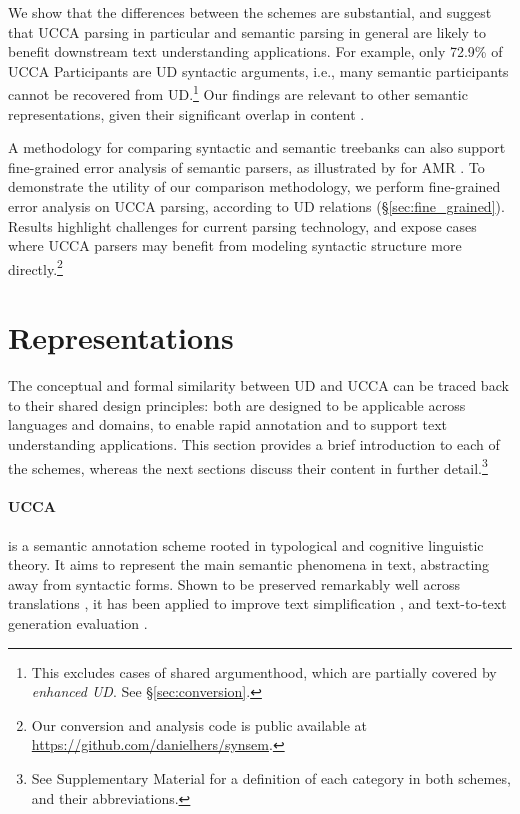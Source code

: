 \documentclass[11pt,a4paper,table]{article}
\begin{document}
  We show that the differences between the schemes are substantial, and suggest that
  UCCA parsing in particular and semantic parsing in general are likely to benefit
  downstream text understanding applications.
  For example, only 72.9\% of UCCA Participants are UD syntactic arguments,
  i.e., many semantic participants cannot be recovered from UD.\footnote{This excludes cases of shared 
  argumenthood, which are partially covered by \textit{enhanced UD}. See \S\ref{sec:conversion}.}
  Our findings are relevant to other semantic representations, given their 
  significant overlap in content \cite{abend2017state}.
      
  A methodology for comparing syntactic and semantic treebanks can also support fine-grained error 
  analysis of semantic parsers, as illustrated by \citet{szubert2018structured} 
  for AMR \citep{banarescu2013abstract}.
  To demonstrate the utility of our comparison methodology,
  we perform fine-grained error analysis on UCCA parsing,
  according to UD relations (\S\ref{sec:fine_grained}).
  Results highlight challenges for current parsing technology,
  and expose cases where UCCA parsers may benefit from modeling syntactic structure more directly.\footnote{Our conversion and analysis code is public available
  at \url{https://github.com/danielhers/synsem}.}



\section{Representations}\label{sec:representations}

  The conceptual and formal similarity between UD and UCCA can be traced back
  to their shared design principles:
  both are designed to be applicable across languages and domains, 
  to enable rapid annotation and to support text understanding
  applications. This section provides a brief introduction to each of the schemes, whereas
  the next sections discuss their content in further
  detail.\footnote{See Supplementary Material for a definition of each category in both schemes,
  and their abbreviations.}
  


\paragraph{UCCA}\label{sec:ucca}
  is a semantic annotation scheme rooted in typological 
  and cognitive linguistic theory.
  It aims to represent the main semantic phenomena in text, abstracting away from syntactic forms.
  Shown to be preserved remarkably well across translations \citep{sulem2015conceptual}, it has been applied to
  improve text simplification \citep{sulem2018simple},
  and text-to-text generation evaluation \citep{birch2016hume,choshen2018usim,sulem2018samsa}.
  
\end{document}
